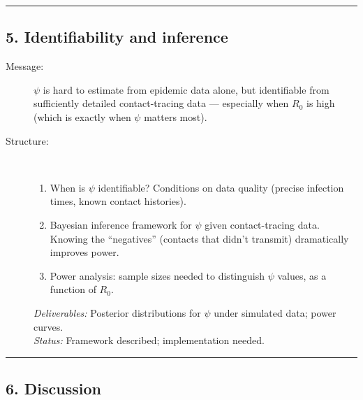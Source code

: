 \noindent\rule{\textwidth}{0.4pt}

\subsection*{5. Identifiability and inference}

\begin{description}
    \item[Message:] $\psi$ is hard to estimate from epidemic data alone, but identifiable from sufficiently detailed contact-tracing data --- especially when $R_0$ is high (which is exactly when $\psi$ matters most).

    \item[Structure:]~
    \begin{enumerate}
        \item When is $\psi$ identifiable? Conditions on data quality (precise infection times, known contact histories).
        \item Bayesian inference framework for $\psi$ given contact-tracing data. Knowing the ``negatives'' (contacts that didn't transmit) dramatically improves power.
        \item Power analysis: sample sizes needed to distinguish $\psi$ values, as a function of $R_0$.
    \end{enumerate}
    \textit{Deliverables:} Posterior distributions for $\psi$ under simulated data; power curves. \\
    \textit{Status:} Framework described; implementation needed.
\end{description}

\noindent\rule{\textwidth}{0.4pt}

\subsection*{6. Discussion}

